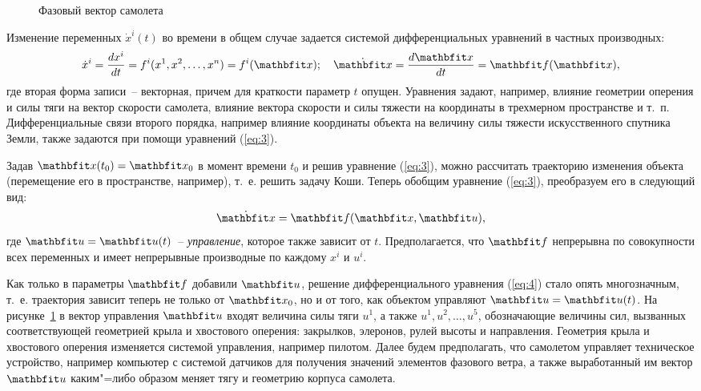 \documentclass[a4paper,14pt, openany, twoside, final]{extbook} %
\begin{document}
\begin{figure}[bh]
  \centering
  \footnotesize
      \def\xyz{$x^1,x^2,x^3,\;x^4,x^5,x^6$} \def\yaw{$x^7,x^8$} \def\pitch{$x^9,x^{10}$}
      \def\roll{$\!\!\!\!\!\!x^{11},x^{12}$} \def\lift{$x^{13}$} \def\down{$\!\!x^{14}$}
      \def\thrust{$u^1$} \def\rudder{$u^5$} \def\drag{$x^{15}$}
      \def\flaps{$u^2$} \def\aeleron{$u^3$} \def\engine{}
      \def\elevator{$u^4$} \def\svgwidth{0.80\columnwidth}
      
  \caption{Фазовый вектор самолета}
  \label{fig:phasecoords}
\end{figure}

Изменение переменных $\dot{x}^i(t)$ во времени в общем случае задается системой дифференциальных уравнений в частных производных:
\begin{equation}
  \label{eq:3}
\dot{x}^i=\frac{dx^i}{dt}=f^i(x^1,x^2,\ldots,x^n)=f^i(\vecx);\quad
   \dot{\vecx}=\frac{d\vecx}{dt}=\vecf(\vecx),
\end{equation}
где вторая форма записи~-- векторная, причем для краткости параметр $t$ опущен. Уравнения задают, например, влияние геометрии оперения и силы тяги на вектор скорости самолета, влияние вектора скорости и силы тяжести на координаты в трехмерном пространстве и т.~п.  Дифференциальные связи второго порядка, например влияние координаты объекта на величину силы тяжести искусственного спутника Земли, также задаются при помощи уравнений (\ref{eq:3}).

Задав $\vecx(t_0)=\vecx_0$ в момент времени $t_0$ и решив уравнение (\ref{eq:3}), можно рассчитать траекторию изменения объекта (перемещение его в пространстве, например), т.~е. решить задачу Коши.  Теперь обобщим уравнение (\ref{eq:3}), преобразуем его в следующий вид:
\begin{equation}
  \label{eq:4}
  \dot{\vecx}=\vecf(\vecx,\vecu),
\end{equation}
где $\vecu=\vecu(t)$~-- \emph{управление}, которое также зависит от $t$.  Предполагается, что $\vecf$ непрерывна по совокупности всех переменных и имеет непрерывные производные по каждому $x^i$ и $u^i$.

Как только в параметры $\vecf$ добавили $\vecu$, решение дифференциального уравнения (\ref{eq:4}) стало опять многозначным, т.~е. траектория зависит теперь не только от $\vecx_0$, но и от того, как объектом управляют $\vecu=\vecu(t)$.  На рисунке~\ref{fig:phasecoords} в вектор управления $\vecu$ входят величина силы тяги $u^1$, а также $u^1,u^2,\ldots,u^5$, обозначающие величины сил, вызванных соответствующей геометрией крыла и хвостового оперения: закрылков, элеронов, рулей высоты и направления.  Геометрия крыла и хвостового оперения изменяется системой управления, например пилотом.  Далее будем предполагать, что самолетом управляет техническое устройство, например компьютер с системой датчиков для получения значений элементов фазового ветра, а также выработанный им вектор $\vecu$ каким"=либо образом меняет тягу и геометрию корпуса самолета.
\end{document}
